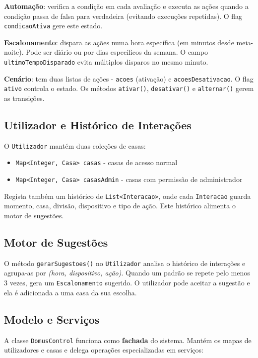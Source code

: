 \documentclass[a4paper]{article}
\begin{document}
\textbf{Automação}: verifica a condição em cada avaliação e executa as ações quando a condição passa de falsa para verdadeira (evitando execuções repetidas). O flag \texttt{condicaoAtiva} gere este estado.

\textbf{Escalonamento}: dispara as ações numa hora específica (em minutos desde meia-noite). Pode ser diário ou por dias específicos da semana. O campo \texttt{ultimoTempoDisparado} evita múltiplos disparos no mesmo minuto.

\textbf{Cenário}: tem duas listas de ações - \texttt{acoes} (ativação) e \texttt{acoesDesativacao}. O flag \texttt{ativo} controla o estado. Os métodos \texttt{ativar()}, \texttt{desativar()} e \texttt{alternar()} gerem as transições.

\subsection{Utilizador e Histórico de Interações}

O \texttt{Utilizador} mantém duas coleções de casas:

\begin{itemize}
    \item \texttt{Map<Integer, Casa> casas} - casas de acesso normal
    \item \texttt{Map<Integer, Casa> casasAdmin} - casas com permissão de administrador
\end{itemize}

Regista também um histórico de \texttt{List<Interacao>}, onde cada \texttt{Interacao} guarda momento, casa, divisão, dispositivo e tipo de ação. Este histórico alimenta o motor de sugestões.

\subsection{Motor de Sugestões}

O método \texttt{gerarSugestoes()} no \texttt{Utilizador} analisa o histórico de interações e agrupa-as por \textit{(hora, dispositivo, ação)}. Quando um padrão se repete pelo menos 3 vezes, gera um \texttt{Escalonamento} sugerido. O utilizador pode aceitar a sugestão e ela é adicionada a uma casa da sua escolha.

\subsection{Modelo e Serviços}

A classe \texttt{DomusControl} funciona como \textbf{fachada} do sistema. Mantém os mapas de utilizadores e casas e delega operações especializadas em serviços:
\end{document}
